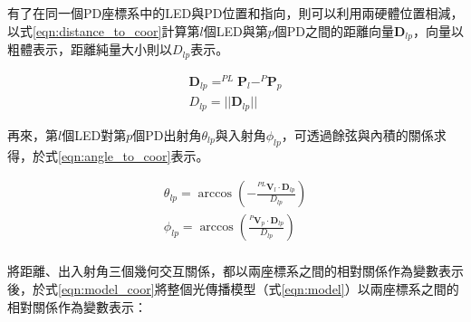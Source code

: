     
    
    
                
                    有了在同一個PD座標系中的LED與PD位置和指向，則可以利用兩硬體位置相減，以式\ref{eqn:distance_to_coor}計算第$l$個LED與第$p$個PD之間的距離向量$\boldsymbol{D}_{lp}$，向量以粗體表示，距離純量大小則以${D}_{lp}$表示。
                    
                    \begin{equation}
                        \label{eqn:distance_to_coor}
                        \begin{aligned}
                        \boldsymbol{D}_{lp} = ^{PL}\boldsymbol{P}_l- ^{P}\boldsymbol{P}_p \\
                        D_{lp} = ||\boldsymbol{D}_{lp}||
                        \end{aligned}
                    \end{equation}
            
                    \qquad
                    再來，第$l$個LED對第$p$個PD出射角$\theta_{lp}$與入射角$\phi_{lp}$，可透過餘弦與內積的關係求得，於式\ref{eqn:angle_to_coor}表示。
            
                    \begin{equation}
                        \label{eqn:angle_to_coor}
                        \begin{aligned}
                        \theta_{lp} = \arccos(-\frac{^{PL}\boldsymbol{V}_l \cdot {\boldsymbol{D}_{lp}}}{D_{lp}})\\
                        \phi_{lp} = \arccos(\frac{^{P}\boldsymbol{V}_p \cdot {\boldsymbol{D}_{lp}}}{D_{lp}})\\
                        \end{aligned}
                    \end{equation}
    
            
                將距離、出入射角三個幾何交互關係，都以兩座標系之間的相對關係作為變數表示後，於式\ref{eqn:model_coor}將整個光傳播模型（式\ref{eqn:model}）以兩座標系之間的相對關係作為變數表示：
        
